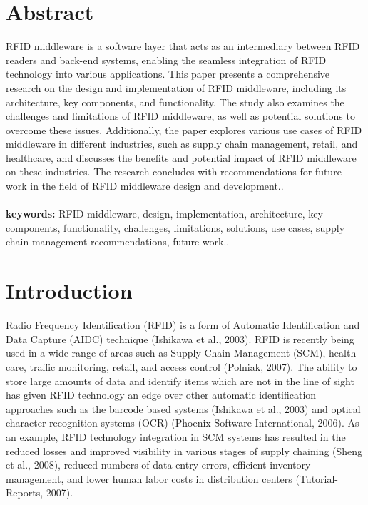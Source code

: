 \documentclass[a4paper,12pt]{article}
\begin{document}
\begin{multicols}{2}
\section{Abstract}
RFID middleware is a software layer that acts as an intermediary between RFID readers and back-end systems, enabling the seamless integration of RFID technology into various applications. This paper presents a comprehensive research on the design and implementation of RFID middleware, including its architecture, key components, and functionality. The study also examines the challenges and limitations of RFID middleware, as well as potential solutions to overcome these issues. Additionally, the paper explores various use cases of RFID middleware in different industries, such as supply chain management, retail, and healthcare, and discusses the benefits and potential impact of RFID middleware on these industries. The research concludes with recommendations for future work in the field of RFID middleware design and development..\\
\\
\textbf{keywords:}
RFID middleware, design, implementation, architecture, key components, functionality, challenges, limitations, solutions, use cases, supply chain management recommendations, future work..
\section{Introduction}
Radio Frequency Identification (RFID) is a form of Automatic Identification and Data Capture (AIDC) technique (Ishikawa et al., 2003). RFID is recently being used in a wide range of areas such as Supply Chain Management (SCM), health care, traffic monitoring, retail, and access control (Polniak, 2007). The ability to store large amounts of data and identify items which are not in the line of sight has given RFID technology an edge over other automatic identification approaches such as the barcode based systems (Ishikawa et al., 2003) and optical character recognition systems (OCR) (Phoenix Software International, 2006). As an example, RFID technology integration in SCM systems has resulted in the reduced losses and improved visibility in various stages of supply chaining (Sheng et al., 2008), reduced numbers of data entry errors, efficient inventory management, and lower human labor costs in distribution centers (Tutorial-Reports, 2007).


\end{multicols}
\end{document}

